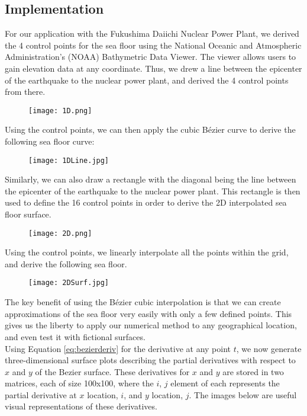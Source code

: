\documentclass[../main.tex]{subfiles}
\begin{document}
\subsection{Implementation}
For our application with the Fukushima Daiichi Nuclear Power Plant, we derived the 4 control points for the sea floor using the National Oceanic and Atmospheric Administration's (NOAA) Bathymetric Data Viewer.  The viewer allows users to gain elevation data at any coordinate.  Thus, we drew a line between the epicenter of the earthquake to the nuclear power plant, and derived the 4 control points from there.
\begin{figure}[H]
\centering
\texttt{[image: 1D.png]}
\end{figure}
\noindent Using the control points, we can then apply the cubic B\'ezier curve to derive the following sea floor curve:
\begin{figure}[H]
\centering
\texttt{[image: 1DLine.jpg]}
\end{figure}
\noindent Similarly, we can also draw a rectangle with the diagonal being the line between the epicenter of the earthquake to the nuclear power plant.  This rectangle is then used to define the 16 control points in order to derive the 2D interpolated sea floor surface.
\begin{figure}[H]
\centering
\texttt{[image: 2D.png]}
\end{figure}
\noindent Using the control points, we linearly interpolate all the points within the grid, and derive the following sea floor.
\begin{figure}[H]
\centering
\texttt{[image: 2DSurf.jpg]}
\end{figure}

\noindent The key benefit of using the B\'ezier cubic interpolation is that we can create approximations of the sea floor very easily with only a few defined points.  This gives us the liberty to apply our numerical method to any geographical location, and even test it with fictional surfaces. \\


\noindent Using Equation \ref{eq:bezierderiv} for the derivative at any point $t$, we now generate three-dimensional surface plots describing the partial derivatives with respect to $x$ and $y$ of the Bezier surface. These derivatives for $x$ and $y$ are stored in two matrices, each of size 100x100, where the $i$, $j$ element of each represents the partial derivative at $x$ location, $i$, and $y$ location, $j$. The images below are useful visual representations of these derivatives.
\end{document}
